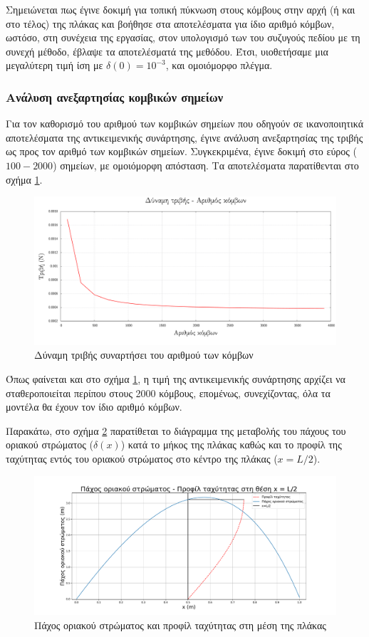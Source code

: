 Σημειώνεται πως έγινε δοκιμή για τοπική πύκνωση στους κόμβους στην αρχή (ή και στο τέλος) της πλάκας και βοήθησε στα αποτελέσματα για ίδιο αριθμό κόμβων, ωστόσο, στη συνέχεια της εργασίας, στον υπολογισμό των του συζυγούς πεδίου με τη συνεχή μέθοδο, έβλαψε τα αποτελέσματά της μεθόδου. Έτσι, υιοθετήσαμε μια μεγαλύτερη τιμή ίση με $\delta(0) = 10^{-3}$, και ομοιόμορφο πλέγμα.

\subsubsection{Ανάλυση ανεξαρτησίας κομβικών σημείων}

Για τον καθορισμό του αριθμού των κομβικών σημείων που οδηγούν σε ικανοποιητικά αποτελέσματα της αντικειμενικής συνάρτησης, έγινε ανάλυση ανεξαρτησίας της τριβής ως προς τον αριθμό των κομβικών σημείων. Συγκεκριμένα, έγινε δοκιμή στο εύρος ($100-2000$) σημείων, με ομοιόμορφη απόσταση. Τα αποτελέσματα παρατίθενται στο σχήμα \ref{fig:node_Friction}.


\begin{figure}[h!]
    \centering
    \includegraphics[width=.85\textwidth]{figures/node_dep.pdf}
    \caption{Δύναμη τριβής συναρτήσει του αριθμού των κόμβων}
    \label{fig:node_Friction}
\end{figure}

Όπως φαίνεται και στο σχήμα \ref{fig:node_Friction}, η τιμή της αντικειμενικής συνάρτησης αρχίζει να σταθεροποιείται περίπου στους 2000 κόμβους, επομένως, συνεχίζοντας, όλα τα μοντέλα θα έχουν τον ίδιο αριθμό κόμβων.

Παρακάτω, στο σχήμα \ref{fig:velProf} παρατίθεται το διάγραμμα της μεταβολής του πάχους του οριακού στρώματος ($\delta(x)$) κατά το μήκος της πλάκας καθώς και το προφίλ της ταχύτητας εντός του οριακού στρώματος στο κέντρο της πλάκας ($x=L/2$).

\begin{figure}[h!]
    \centering
    \includegraphics[width=.85\textwidth]{figures/velocity_profile.pdf}
    \caption{Πάχος οριακού στρώματος και προφίλ ταχύτητας στη μέση της πλάκας}
    \label{fig:velProf}
\end{figure}

